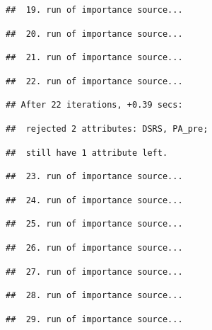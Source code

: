 \documentclass[
]{article}
\begin{document}
\begin{verbatim}
##  19. run of importance source...
\end{verbatim}

\begin{verbatim}
##  20. run of importance source...
\end{verbatim}

\begin{verbatim}
##  21. run of importance source...
\end{verbatim}

\begin{verbatim}
##  22. run of importance source...
\end{verbatim}

\begin{verbatim}
## After 22 iterations, +0.39 secs:
\end{verbatim}

\begin{verbatim}
##  rejected 2 attributes: DSRS, PA_pre;
\end{verbatim}

\begin{verbatim}
##  still have 1 attribute left.
\end{verbatim}

\begin{verbatim}
##  23. run of importance source...
\end{verbatim}

\begin{verbatim}
##  24. run of importance source...
\end{verbatim}

\begin{verbatim}
##  25. run of importance source...
\end{verbatim}

\begin{verbatim}
##  26. run of importance source...
\end{verbatim}

\begin{verbatim}
##  27. run of importance source...
\end{verbatim}

\begin{verbatim}
##  28. run of importance source...
\end{verbatim}

\begin{verbatim}
##  29. run of importance source...
\end{verbatim}
\end{document}
